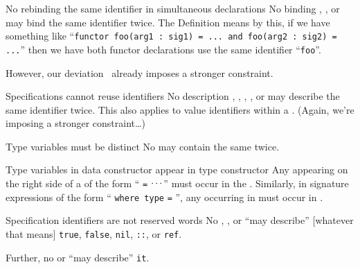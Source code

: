 \begin{clause}{No rebinding the same identifier in simultaneous declarations}
No binding , , or
 may bind the same identifier twice.
The Definition means by this, if we have something like 
``\texttt{functor foo(arg1 : sig1) = ... and foo(arg2 : sig2) = ...}''
then we have both functor declarations use the same identifier
``\texttt{foo}''.

However, our deviation~ already imposes
a stronger constraint.
\end{clause}

\begin{clause}{Specifications cannot reuse identifiers}
No description , ,
, , or 
may describe the same identifier twice. This also applies to value
identifiers within a . (Again, we're imposing a
stronger constraint\dots)
\end{clause}

\begin{clause}{Type variables must be distinct}
No  may contain the same  twice.
\end{clause}

\begin{clause}{Type variables in data constructor appear in type constructor}
Any  appearing on the right side of a
 of the form ``
 \texttt{=} $\mathinner{{}^{\textstyle .\,.\,.}}$'' must occur in the
. Similarly, in signature expressions of the form
`` \texttt{where type} 
 \texttt{=} '', any
 occurring in  must occur in . 
\end{clause}

\begin{clause}{Specification identifiers are not reserved words}
No , , or 
``may describe'' [whatever that means] \texttt{true}, \texttt{false},
\texttt{nil}, \texttt{::}, or \texttt{ref}.

Further, no  or  ``may describe''
\texttt{it}. 
\end{clause}


